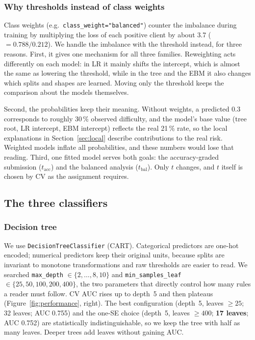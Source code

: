 \documentclass[a4paper,11pt]{article}
\begin{document}
\subsubsection{Why thresholds instead of class weights}
Class weights (e.g.\ \texttt{class\_weight="balanced"}) counter the imbalance during training by multiplying the loss of each positive client by about 3.7 ($=0.788/0.212$). We handle the imbalance with the threshold instead, for three reasons. First, it gives one mechanism for all three families. Reweighting acts differently on each model: in LR it mainly shifts the intercept, which is almost the same as lowering the threshold, while in the tree and the EBM it also changes which splits and shapes are learned. Moving only the threshold keeps the comparison about the models themselves.

Second, the probabilities keep their meaning. Without weights, a predicted 0.3 corresponds to roughly 30\,\% observed difficulty, and the model's base value (tree root, LR intercept, EBM intercept) reflects the real 21\,\% rate, so the local explanations in Section~\ref{sec:local} describe contributions to the real risk. Weighted models inflate all probabilities, and these numbers would lose that reading. Third, one fitted model serves both goals: the accuracy-graded submission ($t_{\text{acc}}$) and the balanced analysis ($t_{\text{bal}}$). Only $t$ changes, and $t$ itself is chosen by CV as the assignment requires.

\subsection{The three classifiers}
\subsubsection{Decision tree}
We use \texttt{DecisionTreeClassifier} (CART). Categorical predictors are one-hot encoded; numerical predictors keep their original units, because splits are invariant to monotone transformations and raw thresholds are easier to read. We searched \texttt{max\_depth} $\in\{2,\dots,8,10\}$ and \texttt{min\_samples\_leaf} $\in\{25,50,100,200,400\}$, the two parameters that directly control how many rules a reader must follow. CV AUC rises up to depth~5 and then plateaus (Figure~\ref{fig:performance}, right). The best configuration (depth~5, leaves $\geq 25$; 32 leaves; AUC 0.755) and the one-SE choice (depth~5, leaves $\geq 400$; \textbf{17 leaves}; AUC 0.752) are statistically indistinguishable, so we keep the tree with half as many leaves. Deeper trees add leaves without gaining AUC.
\end{document}

